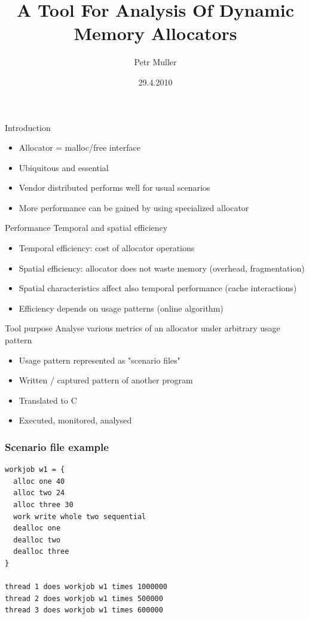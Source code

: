 \documentclass{beamer}
\title{A Tool For Analysis Of Dynamic Memory Allocators}
\author{Petr Muller}
\date{29.4.2010}
\begin{document}
\begin{frame}
\titlepage
\end{frame}

\begin{frame}{Introduction}
\begin{itemize}
\item Allocator = malloc/free interface
\item Ubiquitous and essential
\item Vendor distributed performs well for usual scenarios
\item More performance can be gained by using specialized allocator
\end{itemize}
\end{frame}

\begin{frame}{Performance}
Temporal and spatial efficiency
\begin{itemize}
\item Temporal efficiency: cost of allocator operations
\item Spatial efficiency: allocator does not waste memory (overhead, fragmentation)
\item Spatial characteristics affect also temporal performance (cache interactions)
\item Efficiency depends on usage patterns (online algorithm)
\end{itemize}
\end{frame}

\begin{frame}{Tool purpose}
Analyse various metrics of an allocator under arbitrary usage pattern

\begin{itemize}
\item Usage pattern represented as "scenario files"
\item Written / captured pattern of another program
\item Translated to C
\item Executed, monitored, analysed
\end{itemize}
\end{frame}

\begin{frame}[fragile]
\frametitle{Scenario file example}
\begin{verbatim}
workjob w1 = {
  alloc one 40
  alloc two 24
  alloc three 30
  work write whole two sequential
  dealloc one
  dealloc two
  dealloc three
}

thread 1 does workjob w1 times 1000000
thread 2 does workjob w1 times 500000
thread 3 does workjob w1 times 600000

\end{verbatim}
\end{frame}
\end{document}
